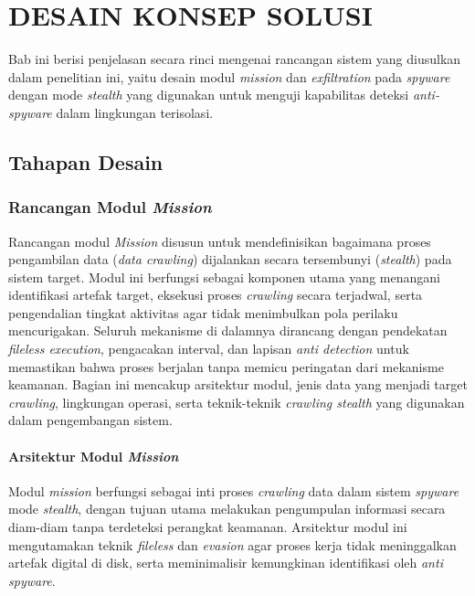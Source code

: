 \setcounter{chapter}{3}  
\chapter{DESAIN KONSEP SOLUSI}
\label{chap:desain-konsep-solusi}

Bab ini berisi penjelasan secara rinci mengenai rancangan sistem yang diusulkan dalam 
penelitian ini, yaitu desain modul \textit{mission} dan \textit{exfiltration} pada \textit{spyware} dengan mode 
\textit{stealth} yang digunakan untuk menguji kapabilitas deteksi \textit{anti-spyware} dalam lingkungan terisolasi. 

\section{Tahapan Desain}
\label{sec:tahapan-desain}

\subsection{Rancangan Modul \textit{Mission}}
\label{subsec:rancangan-mission}

Rancangan modul \textit{Mission} disusun untuk mendefinisikan bagaimana proses pengambilan 
data (\textit{data crawling}) dijalankan secara tersembunyi (\textit{stealth}) pada sistem 
target. Modul ini berfungsi sebagai komponen utama yang menangani identifikasi artefak 
target, eksekusi proses \textit{crawling} secara terjadwal, serta pengendalian tingkat 
aktivitas agar tidak menimbulkan pola perilaku mencurigakan. Seluruh mekanisme di dalamnya 
dirancang dengan pendekatan \textit{fileless execution}, pengacakan interval, dan lapisan 
\textit{anti detection} untuk memastikan bahwa proses berjalan tanpa memicu peringatan 
dari mekanisme keamanan. Bagian ini mencakup arsitektur modul, jenis data yang menjadi target 
\textit{crawling}, lingkungan operasi, serta teknik-teknik \textit{crawling stealth} yang 
digunakan dalam pengembangan sistem.

\subsubsection{Arsitektur Modul \textit{Mission}}
\label{subsubsec:arsitektur-mission}

Modul \textit{mission} berfungsi sebagai inti proses \textit{crawling} data dalam sistem
\textit{spyware} mode \textit{stealth}, dengan tujuan utama melakukan pengumpulan informasi
secara diam-diam tanpa terdeteksi perangkat keamanan. Arsitektur modul ini
mengutamakan teknik \textit{fileless} dan \textit{evasion} agar proses kerja tidak
meninggalkan artefak digital di disk, serta meminimalisir kemungkinan identifikasi
oleh \textit{anti spyware}.

